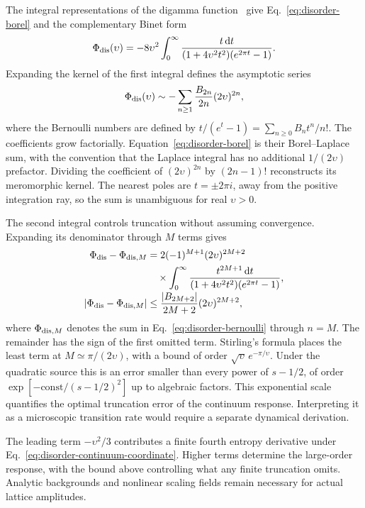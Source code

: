 \documentclass[aps,pre,reprint,amsmath,amssymb,longbibliography,floatfix]{revtex4-2}
\newcommand{\dd}{\,\mathrm d}
\begin{document}
The integral representations of the digamma function~\cite{DLMF2026}
give Eq.~\eqref{eq:disorder-borel} and the complementary Binet form
\begin{equation}
 \Phi_{\rm dis}(\upsilon)=-8\upsilon^2\int_0^\infty
 \frac{t\dd t}{(1+4\upsilon^2t^2)(e^{2\pi t}-1)}.
 \label{eq:disorder-binet}
\end{equation}
Expanding the kernel of the first integral defines the asymptotic series
\begin{equation}
 \Phi_{\rm dis}(\upsilon)
 \sim-\sum_{n\geq1}\frac{B_{2n}}{2n}(2\upsilon)^{2n},
 \label{eq:disorder-bernoulli}
\end{equation}
where the Bernoulli numbers are defined by
$t/(e^t-1)=\sum_{n\geq0}B_n t^n/n!$.
The coefficients grow factorially. Equation~\eqref{eq:disorder-borel}
is their Borel--Laplace sum, with the convention that the Laplace integral
has no additional $1/(2\upsilon)$ prefactor. Dividing the coefficient of
$(2\upsilon)^{2n}$ by $(2n-1)!$ reconstructs its meromorphic kernel.
The nearest poles are $t=\pm2\pi i$, away from the positive integration
ray, so the sum is unambiguous for real $\upsilon>0$.

The second integral controls truncation without assuming convergence.
Expanding its denominator through $M$ terms gives
\begin{align}
 \Phi_{\rm dis}-\Phi_{{\rm dis},M}
 &=2(-1)^{M+1}(2\upsilon)^{2M+2}\nonumber\\
 &\quad\times\int_0^\infty
 \frac{t^{2M+1}\dd t}{(1+4\upsilon^2t^2)(e^{2\pi t}-1)},
 \nonumber\\[-2pt]
 \left|\Phi_{\rm dis}-\Phi_{{\rm dis},M}\right|
 &\leq\frac{|B_{2M+2}|}{2M+2}(2\upsilon)^{2M+2},
 \label{eq:disorder-remainder}
\end{align}
where $\Phi_{{\rm dis},M}$ denotes the sum in
Eq.~\eqref{eq:disorder-bernoulli} through $n=M$.
The remainder has the sign of the first omitted term. Stirling's formula
places the least term at $M\simeq\pi/(2\upsilon)$, with a bound of order
$\sqrt{\upsilon}\,e^{-\pi/\upsilon}$. Under the quadratic source this is
an error smaller than every power of $s-1/2$, of order
$\exp\left[-\mathrm{const}/(s-1/2)^2\right]$ up to algebraic factors.
This exponential scale quantifies the optimal truncation error of the
continuum response. Interpreting it as a microscopic transition rate
would require a separate dynamical derivation.

The leading term $-\upsilon^2/3$ contributes a finite fourth entropy
derivative under Eq.~\eqref{eq:disorder-continuum-coordinate}. Higher
terms determine the large-order response, with the bound above controlling
what any finite truncation omits. Analytic backgrounds and nonlinear
scaling fields remain necessary for actual lattice amplitudes.
\end{document}
